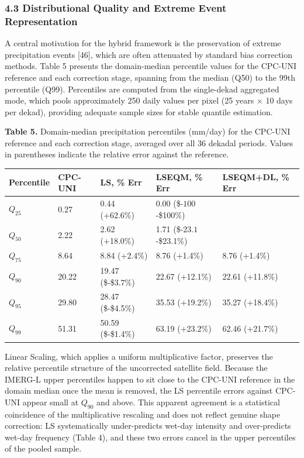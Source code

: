 \documentclass[
]{article}
\begin{document}
\subsubsection{4.3 Distributional Quality and Extreme Event
Representation}\label{distributional-quality-and-extreme-event-representation}

A central motivation for the hybrid framework is the preservation of
extreme precipitation events {[}46{]}, which are often attenuated by
standard bias correction methods. Table 5 presents the domain-median
percentile values for the CPC-UNI reference and each correction stage,
spanning from the median (Q50) to the 99th percentile (Q99). Percentiles
are computed from the single-dekad aggregated mode, which pools
approximately 250 daily values per pixel (25 years \(\times\) 10 days
per dekad), providing adequate sample sizes for stable quantile
estimation.

\textbf{Table 5.} Domain-median precipitation percentiles (mm/day) for
the CPC-UNI reference and each correction stage, averaged over all 36
dekadal periods. Values in parentheses indicate the relative error
against the reference.

\begin{longtable}[]{@{}lllll@{}}
\toprule\noalign{}
Percentile & CPC-UNI & LS, \% Err & LSEQM, \% Err & LSEQM+DL, \% Err \\
\midrule\noalign{}
\endhead
\bottomrule\noalign{}
\endlastfoot
\(Q_{25}\) & 0.27 & 0.44 (+62.6\%) & 0.00 (\$-\(100%
\)-\$100\%) & \\
\(Q_{50}\) & 2.22 & 2.62 (+18.0\%) & 1.71 (\$-\(23.1%
\)-\$23.1\%) & \\
\(Q_{75}\) & 8.64 & 8.84 (+2.4\%) & 8.76 (+1.4\%) & 8.76 (+1.4\%) \\
\(Q_{90}\) & 20.22 & 19.47 (\$-\$3.7\%) & 22.67 (+12.1\%) & 22.61
(+11.8\%) \\
\(Q_{95}\) & 29.80 & 28.47 (\$-\$4.5\%) & 35.53 (+19.2\%) & 35.27
(+18.4\%) \\
\(Q_{99}\) & 51.31 & 50.59 (\$-\$1.4\%) & 63.19 (+23.2\%) & 62.46
(+21.7\%) \\
\end{longtable}

Linear Scaling, which applies a uniform multiplicative factor, preserves
the relative percentile structure of the uncorrected satellite field.
Because the IMERG-L upper percentiles happen to sit close to the CPC-UNI
reference in the domain median once the mean is removed, the LS
percentile errors against CPC-UNI appear small at \(Q_{90}\) and above.
This apparent agreement is a statistical coincidence of the
multiplicative rescaling and does not reflect genuine shape correction:
LS systematically under-predicts wet-day intensity and over-predicts
wet-day frequency (Table 4), and these two errors cancel in the upper
percentiles of the pooled sample.
\end{document}
